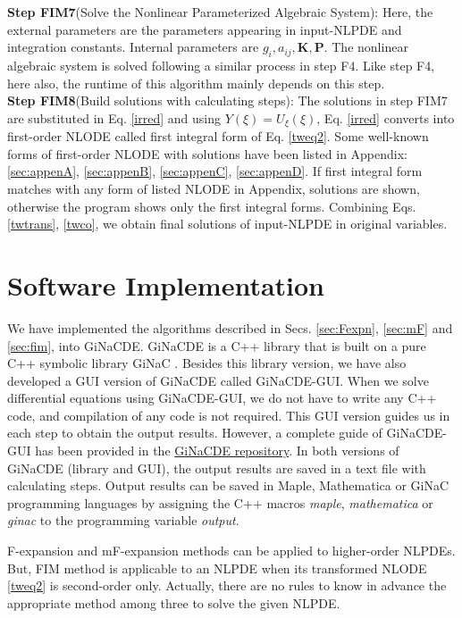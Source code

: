 \documentclass[prd,aps,floats,showkeys,nofootinbib,notitlepage]{revtex4-2}
\begin{document}
	
	\textbf{Step FIM7}(Solve the Nonlinear Parameterized Algebraic System): Here, the external parameters are the parameters appearing in input-NLPDE and integration constants. Internal parameters are $g_i,a_{ij},\boldsymbol{K},\boldsymbol{P}$. The nonlinear algebraic system is solved following a similar process in step F4. Like step F4, here also, the runtime of this algorithm mainly depends on this step.\\
	
	\textbf{Step FIM8}(Build solutions with calculating steps): The solutions in step FIM7 are substituted in Eq. \eqref{irred} and using $Y(\xi)=U_\xi(\xi)$, Eq. \eqref{irred} converts into first-order NLODE called first integral form of Eq. \eqref{tweq2}. Some well-known forms of first-order NLODE with solutions have been listed in Appendix: \ref{sec:appenA}, \ref{sec:appenB}, \ref{sec:appenC}, \ref{sec:appenD}. If first integral form matches with any form of listed NLODE in Appendix, solutions are shown, otherwise the program shows only the first integral forms. Combining Eqs. \eqref{twtrans}, \eqref{twco}, we obtain final solutions of input-NLPDE in original variables.\\
	
	
	\section{Software Implementation}\label{sec:imple}
	We have implemented the algorithms described in Secs. \ref{sec:Fexpn}, \ref{sec:mF} and \ref{sec:fim}, into GiNaCDE. GiNaCDE is a C++ library that is built on a pure C++ symbolic library GiNaC \cite{ginac}. Besides this library version, we have also developed a GUI version of GiNaCDE called GiNaCDE-GUI. When we solve differential equations using GiNaCDE-GUI, we do not have to write any C++ code, and compilation of any code is not required. This GUI version guides us in each step to obtain the output results. However, a complete guide of GiNaCDE-GUI has been provided in the \href{https://github.com/mithun218/GiNaCDE}{GiNaCDE repository}. In both versions of GiNaCDE (library and GUI), the output results are saved in a text file with calculating steps. Output results can be saved in Maple, Mathematica or GiNaC programming languages by assigning the C++ macros {\em maple}, {\em mathematica} or {\em ginac} to the programming variable {\em {output}}. 
	
	F-expansion and mF-expansion methods can be applied to higher-order NLPDEs. But, FIM method is applicable to an NLPDE when its transformed NLODE \eqref{tweq2} is second-order only. Actually, there are no rules to know in advance the appropriate method among three to solve the given NLPDE. 
	
\end{document}

